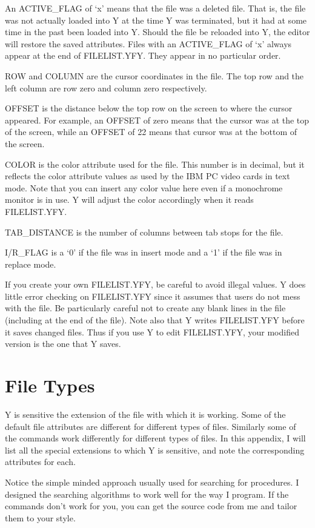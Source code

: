 An ACTIVE\_FLAG of `x' means that the file was a deleted file. That is, the file was not
actually loaded into Y at the time Y was terminated, but it had at some time in the past been
loaded into Y. Should the file be reloaded into Y, the editor will restore the saved attributes.
Files with an ACTIVE\_FLAG of `x' always appear at the end of FILELIST.YFY. They appear in no
particular order.

ROW and COLUMN are the cursor coordinates in the file. The top row and the left column are row
zero and column zero respectively.

OFFSET is the distance below the top row on the screen to where the cursor appeared. For
example, an OFFSET of zero means that the cursor was at the top of the screen, while an OFFSET
of 22 means that cursor was at the bottom of the screen.

COLOR is the color attribute used for the file. This number is in decimal, but it reflects the
color attribute values as used by the IBM PC video cards in text mode. Note that you can insert
any color value here even if a monochrome monitor is in use. Y will adjust the color accordingly
when it reads FILELIST.YFY.

TAB\_DISTANCE is the number of columns between tab stops for the file.

I/R\_FLAG is a `0' if the file was in insert mode and a `1' if the file was in replace mode.

If you create your own FILELIST.YFY, be careful to avoid illegal values. Y does little error
checking on FILELIST.YFY since it assumes that users do not mess with the file. Be particularly
careful not to create any blank lines in the file (including at the end of the file). Note also
that Y writes FILELIST.YFY before it saves changed files. Thus if you use Y to edit
FILELIST.YFY, your modified version is the one that Y saves.

\section{File Types}

Y is sensitive the extension of the file with which it is working. Some of the default file
attributes are different for different types of files. Similarly some of the commands work
differently for different types of files. In this appendix, I will list all the special
extensions to which Y is sensitive, and note the corresponding attributes for each.

Notice the simple minded approach usually used for searching for procedures. I designed the
searching algorithms to work well for the way I program. If the commands don't work for you, you
can get the source code from me and tailor them to your style.

